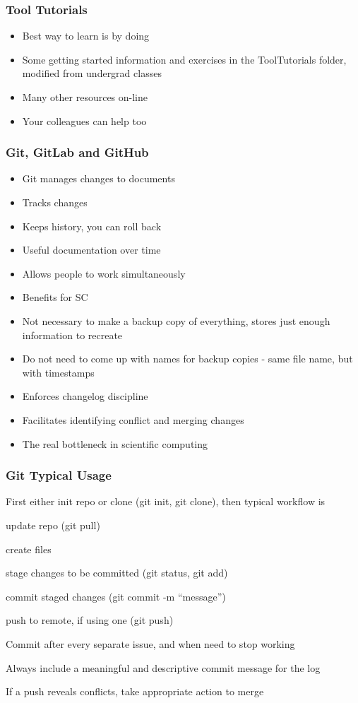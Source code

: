 \documentclass[t,12pt,numbers,fleqn]{beamer}
\begin{document}

\begin{frame}
\frametitle{Tool Tutorials}
\begin{itemize}
\item Best way to learn is by doing
\item Some getting started information and exercises in the ToolTutorials
  folder, modified from undergrad classes
\item Many other resources on-line
\item Your colleagues can help too
\end{itemize}
\end{frame}


\begin{frame}
\frametitle{Git, GitLab and GitHub}
\begin{itemize}
\item Git manages changes to documents
\bi
\item Tracks changes
\item Keeps history, you can roll back
\item Useful documentation over time
\item Allows people to work simultaneously
\ei
\item Benefits for SC \cite{WilsonEtAl2016}
\bi
\item Not necessary to make a backup copy of everything, stores just enough
  information to recreate
\item Do not need to come up with names for backup copies - same file name, but
  with timestamps
\item Enforces changelog discipline
\item Facilitates identifying conflict and merging changes
\ei
\item The real bottleneck in scientific computing~\cite{Wilson2006}
\end{itemize}
\end{frame}


\begin{frame}
\frametitle{Git Typical Usage}

First either init repo or clone (git init, git clone), then typical workflow is
\be
\item update repo (git pull)
\item create files
\item stage changes to be committed (git status, git add)
\item commit staged changes (git commit -m ``message'')
\item push to remote, if using one (git push)
\ee
\bi
\item Commit after every separate issue, and when need to stop working
\item Always include a meaningful and descriptive commit message for the log
\item If a push reveals conflicts, take appropriate action to merge
\ei
\end{frame}
\end{document}
